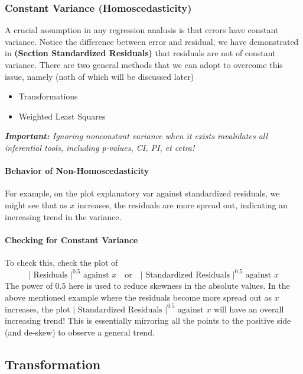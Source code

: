 \documentclass[11pt]{article}
\begin{document}
\subsubsection{Constant Variance (Homoscedasticity)}
A crucial assumption in any regression analusis is that errors have constant variance. \color{BurntOrange} Notice the difference between error and residual, we have demonstrated in \textbf{(Section Standardized Residuals)} that residuals are not of constant variance. \color{Black} There are two general methods that we can adopt to overcome this issue, namely (noth of which will be discussed later)
\begin{itemize}
    \item Transformations
    \item Weighted Least Squares
\end{itemize}
\color{Red}
\textit{\textbf{Important:} Ignoring nonconstant variance when it exists invalidates all inferential tools, including p-values, CI, PI, et cetra!}
\color{Black}

\paragraph{Behavior of Non-Homoscedasticity} For example, on the plot explanatory var against standardized residuals, we might see that as $x$ increases, the residuals are more spread out, indicating an increasing trend in the variance. 

\paragraph{Checking for Constant Variance} To check this, check the plot of
\begin{equation*}
    |\text{ Residuals }|^{0.5} \text { against } x \quad \text{or} \quad |\text { Standardized Residuals }|^{0.5} \text { against } x
\end{equation*}
The power of $0.5$ here is used to reduce skewness in the absolute values. In the above mentioned example where the residuals become more spread out as $x$ increases, the plot $|\text { Standardized Residuals }|^{0.5} \text { against } x$ will have an overall increasing trend! \color{BurntOrange} This is essentially mirroring all the points to the positive side (and de-skew) to observe a general trend. \color{Black}

\subsection{Transformation}
\end{document}
